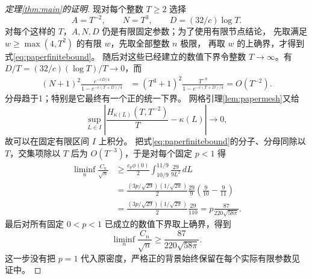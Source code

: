 \documentclass[UTF8,a4paper,11pt,fontset=fandol]{ctexart}
\theoremstyle{remark}
\begin{document}
\begin{proof}[定理\ref{thm:main}的证明]
现对每个整数 $T\ge2$ 选择
\[
 A=T^{-2},\qquad N=T^3,\qquad D=(32/c)\log T.
\]
对每个这样的 $T$，$A,N,D$ 仍是有限固定参数；为了使用有限节点结论，
先取满足 $w\ge\max(4,T^2)$ 的有限 $w$，先取全部整数 $n$ 极限，
再取 $w$ 的上确界，才得到式\eqref{eq:paperfinitebound}。
随后对这些已经建立的数值下界令整数 $T\to\infty$。有
$D/T=(32/c)(\log T)/T\to0$，而
\begin{align*}
 (N+1)^2\frac{e^{-cD/4}}{1-e^{-c(T+D)/4}}
 &=(T^3+1)^2\frac{T^{-8}}{1-e^{-c(T+D)/4}}
 =O(T^{-2}).
\end{align*}
分母趋于1；特别是它最终有一个正的统一下界。
网格引理\ref{lem:papermesh}又给
\[
 \sup_{L\in I}\left|\frac{H_{\kappa(L)}(T,T^{-2})}T-\kappa(L)\right|
 \longrightarrow0,
\]
故可以在固定有限区间 $I$ 上积分。
把式\eqref{eq:paperfinitebound}的分子、分母同除以 $T$，交集项除以
$T$ 后为 $O(T^{-3})$，于是对每个固定 $p<1$ 得
\begin{align*}
 \liminf_n\frac{C_n}{\sqrt n}
 &\ge\frac{c_p\phi(0)}2\int_{10/9}^{11/9}\frac{29}{9L^2}\,dL\\
 &=\frac{(3p/\sqrt{29})(1/\sqrt{2\pi})}{2}
 \frac{29}{9}\left(\frac9{10}-\frac9{11}\right)\\
 &=\frac{(3p/\sqrt{29})(1/\sqrt{2\pi})}{2}\frac{29}{110}
 =p\frac{87}{220\sqrt{58\pi}}.
\end{align*}
最后对所有固定 $0<p<1$ 已成立的数值下界取上确界，得到
\[
 \liminf_n\frac{C_n}{\sqrt n}\ge\frac{87}{220\sqrt{58\pi}}.
\]
这一步没有把 $p=1$ 代入原密度，严格正的背景始终保留在每个实际有限参数见证中。
\end{proof}
\end{document}
